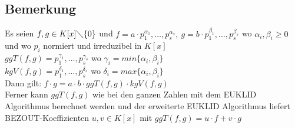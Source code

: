 \subsection{Bemerkung}
Es seien $f,g \in K[x] \diagdown \{0\}$ und $f =a \cdot  p_{1}^{\alpha_{1}}, \dotsc, p_{s}^{\alpha_{s}}, \ g = b \cdot p_{1}^{\beta_{1}}, \dotsc, p_{s}^{\beta_{s}}$ wo $\alpha_{i}, \beta_{i} \geq 0$ und wo $p_{i}$ normiert und irreduzibel in $K[x]$\\
$ggT(f,g)=p_{1}^{\gamma_{1}}, \dotsc, p_{s}^{\gamma_{s}}$ wo $\gamma_{i} = min \{\alpha_{i}, \beta_{i}\}$\\
$kgV(f,g)=p_{1}^{\delta_{1}},\dotsc, p_{s}^{\delta_{s}}$ wo $\delta_{i} = max \{\alpha_{i}, \beta_{i}\}$\\
Dann gilt: $f \cdot g = a \cdot b \cdot ggT(f,g) \cdot kgV(f,g)$\\
Ferner kann $ggT(f,g)$ wie bei den ganzen Zahlen mit dem EUKLID Algorithmus berechnet werden und der erweiterte EUKLID Algorithmus liefert BEZOUT-Koeffizienten $u,v \in K[x]$ mit $ggT(f,g) = u \cdot f + v \cdot g$